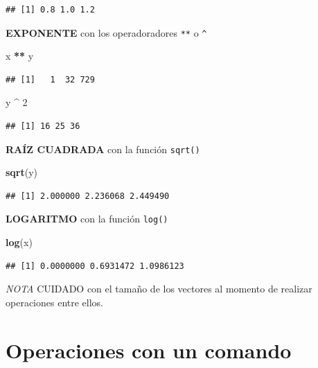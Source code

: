 \documentclass[
]{book}
\newenvironment{Shaded}{\begin{snugshade}}{\end{snugshade}}
\newcommand{\DecValTok}[1]{\textcolor[rgb]{0.00,0.00,0.81}{#1}}
\newcommand{\FunctionTok}[1]{\textcolor[rgb]{0.13,0.29,0.53}{\textbf{#1}}}
\newcommand{\NormalTok}[1]{#1}
\newcommand{\SpecialCharTok}[1]{\textcolor[rgb]{0.81,0.36,0.00}{\textbf{#1}}}
\begin{document}
\begin{verbatim}
## [1] 0.8 1.0 1.2
\end{verbatim}

\textbf{EXPONENTE} con los operadoradores \texttt{**} o \texttt{\^{}}

\begin{Shaded}
\begin{Highlighting}[]
\NormalTok{x }\SpecialCharTok{**}\NormalTok{ y}
\end{Highlighting}
\end{Shaded}

\begin{verbatim}
## [1]   1  32 729
\end{verbatim}

\begin{Shaded}
\begin{Highlighting}[]
\NormalTok{y }\SpecialCharTok{\^{}} \DecValTok{2}
\end{Highlighting}
\end{Shaded}

\begin{verbatim}
## [1] 16 25 36
\end{verbatim}

\textbf{RAÍZ CUADRADA} con la función \texttt{sqrt()}

\begin{Shaded}
\begin{Highlighting}[]
\FunctionTok{sqrt}\NormalTok{(y)}
\end{Highlighting}
\end{Shaded}

\begin{verbatim}
## [1] 2.000000 2.236068 2.449490
\end{verbatim}

\textbf{LOGARITMO} con la función \texttt{log()}

\begin{Shaded}
\begin{Highlighting}[]
\FunctionTok{log}\NormalTok{(x)}
\end{Highlighting}
\end{Shaded}

\begin{verbatim}
## [1] 0.0000000 0.6931472 1.0986123
\end{verbatim}

\emph{NOTA} CUIDADO con el tamaño de los vectores al momento de realizar operaciones entre ellos.

\section{Operaciones con un comando}\label{operaciones-con-un-comando}
\end{document}
